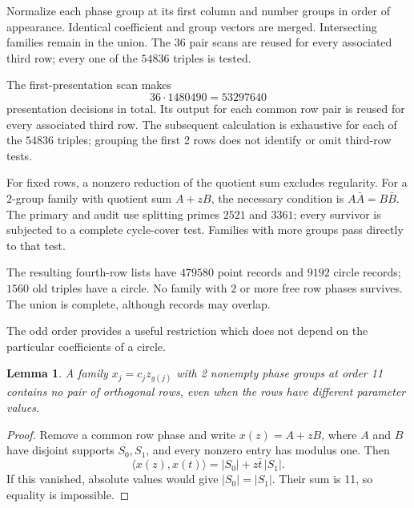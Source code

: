 \documentclass[11pt,a4paper]{article}
\newtheorem{lemma}[theorem]{Lemma}
\theoremstyle{plain}
\theoremstyle{definition}
\theoremstyle{plain}
\begin{document}
Normalize each phase group at its first column and number groups in order of appearance. Identical coefficient and group vectors are merged. Intersecting families remain in the union. The $36$ pair scans are reused for every associated third row; every one of the $54836$ triples is tested.

The first-presentation scan makes
$$36\cdot1480490=53297640$$
presentation decisions in total. Its output for each common row pair is reused for every associated third row. The subsequent calculation is exhaustive for each of the $54836$ triples; grouping the first 2 rows does not identify or omit third-row tests.

\medskip

For fixed rows, a nonzero reduction of the quotient sum excludes regularity. For a $2$-group family with quotient sum $A+zB$, the necessary condition is $A\bar A=B\bar B$. The primary and audit use splitting primes $2521$ and $3361$; every survivor is subjected to a complete cycle-cover test. Families with more groups pass directly to that test.

The resulting fourth-row lists have $479580$ point records and $9192$ circle records; $1560$ old triples have a circle. No family with $2$ or more free row phases survives. The union is complete, although records may overlap.

\medskip
The odd order provides a useful restriction which does not depend on the particular coefficients of a circle.

\par\addvspace{\medskipamount}\noindent
\begin{minipage}{\linewidth}
\begin{lemma}\label{n11_fourth:circle}
A family $x_j=c_jz_{g(j)}$ with 2 nonempty phase groups at order 11 contains no pair of orthogonal rows, even when the rows have different parameter values.
\end{lemma}
\end{minipage}
\par\addvspace{\medskipamount}

\begin{proof}
Remove a common row phase and write $x(z)=A+zB$, where $A$ and $B$ have disjoint supports $S_0,S_1$, and every nonzero entry has modulus one. Then
$$\langle x(z),x(t)\rangle=|S_0|+z\bar t\,|S_1|.$$
If this vanished, absolute values would give $|S_0|=|S_1|$. Their sum is 11, so equality is impossible.
\end{proof}
\end{document}
